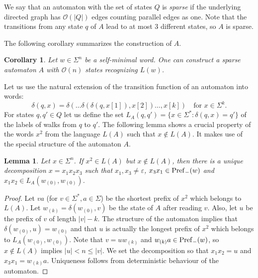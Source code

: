 \documentclass{article}
\newcommand{\mayqed}{}
\newcommand{\Oh}{\mathcal{O}}
\newcommand{\eps}{\varepsilon}
\newtheorem{corollary}[theorem]{Corollary}
\newtheorem{lemma}[theorem]{Lemma}
\theoremstyle{definition}
\theoremstyle{remark}
\begin{document}
We say that an automaton with the set of states $Q$ is \emph{sparse}
if the underlying directed graph has $\Oh(|Q|)$ edges counting parallel edges as one.
Note that the transitions from any state $q$ of $A$ lead to at most 3 different
states, so $A$ is sparse.

The following corollary summarizes the construction of $A$.
\begin{corollary}\label{cor:auto}
  Let $w\in \Sigma^n$ be a self-minimal word. One can construct a sparse 
  automaton $A$ with $\Oh(n)$ states recognizing $L(w)$.
\end{corollary}

Let us use the natural extension of the transition function of an automaton into words:
$$\delta(q,x) = \delta(\ldots\delta(\delta(q,x[1]),x[2])\ldots,x[k]) \quad\mbox{for }x \in \Sigma^k.$$
For states $q,q'\in Q$ let us define the set $L_A(q,q')=\{x\in \Sigma^* : \delta(q,x)=q'\}$
of the labels of walks from $q$ to $q'$.
The following lemma shows a crucial property of the words $x^2$ from the language $L(A)$
such that $x \not\in L(A)$.
It makes use of the special structure of the automaton $A$.

\begin{lemma}\label{lem:comb_crucial}
  Let $x\in \Sigma^n$. If $x^2\in L(A)$ but $x\notin L(A)$,
  then there is a unique decomposition $x=x_1x_2x_3$ such that $x_1,x_3 \ne \eps$, $x_3x_1\in \mathrm{Pref}_{-}(w)$ and
  $x_1x_2 \in L_A(w_{(0)},w_{(0)})$. 
\end{lemma}
\begin{proof}
  Let $va$ (for $v\in \Sigma^*, a\in \Sigma$) be the shortest prefix of $x^2$ which belongs to $L(A)$.
  Let $w_{(k)}=\delta(w_{(0)},v)$ be the state of $A$ after reading $v$. 
  Also, let $u$ be the prefix of $v$ of length $|v|-k$. 
  The structure of the automaton implies that $\delta(w_{(0)},u)=w_{(0)}$ and that
  $u$ is actually the longest prefix of $x^2$ which belongs to $L_A(w_{(0)},w_{(0)})$.
  Note that $v=uw_{(k)}$ and $w_{(k)}a\in \mathrm{Pref}_{-}(w)$, so $x\notin L(A)$ implies $|u|<n \le |v|$.
  We set the decomposition so that $x_1x_2=u$ and $x_3x_1=w_{(k)}a$.
  Uniqueness follows from deterministic behaviour of the automaton.
\mayqed\end{proof}
\end{document}
